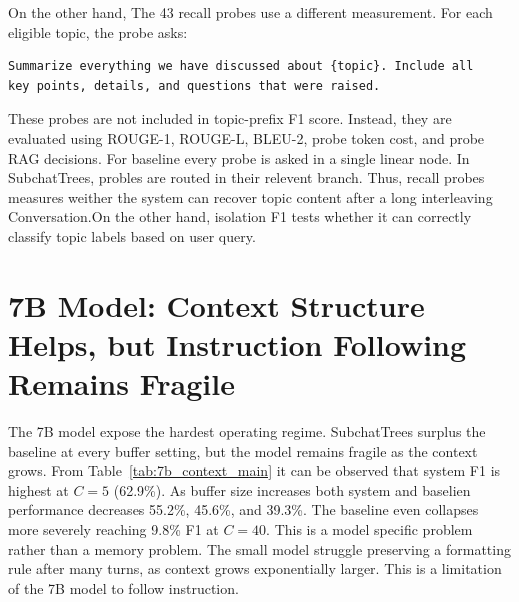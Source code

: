 On the other hand, The 43 recall probes use a different measurement. For each eligible topic, the probe asks:

\begin{verbatim}
Summarize everything we have discussed about {topic}. Include all
key points, details, and questions that were raised.
\end{verbatim}



These probes are not included in topic-prefix F1 score. Instead, they are evaluated using ROUGE-1, ROUGE-L, BLEU-2, probe token cost, and probe RAG decisions. For baseline every probe is asked in a single linear node. In SubchatTrees, probles are routed in their relevent branch. Thus, recall probes measures weither the system can recover topic content after a long interleaving Conversation.On the other hand, isolation F1 tests whether it can correctly classify topic labels based on user query.





\section{7B Model: Context Structure Helps, but Instruction Following Remains Fragile}\label{subsec:results_7b}





The 7B model expose the hardest operating regime. SubchatTrees surplus the baseline at every buffer setting, but the model remains fragile as the context grows. From Table~\ref{tab:7b_context_main} it can be observed that system F1 is highest at $C=5$ (62.9\%). As buffer size increases both system and baselien performance decreases 55.2\%, 45.6\%, and 39.3\%. The baseline even collapses more severely reaching 9.8\% F1 at $C=40$. This is a model specific problem rather than a memory problem. The small model struggle preserving a formatting rule after many turns, as context grows exponentially larger. This is a limitation of the 7B model to follow instruction.




